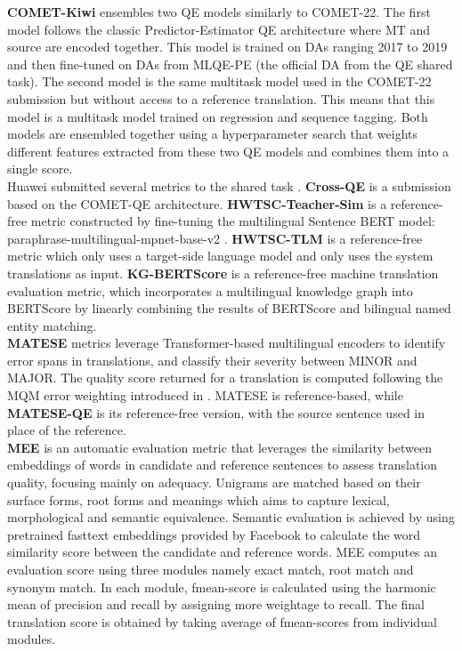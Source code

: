 \documentclass[11pt]{article}
\begin{document}
\noindent \textbf{COMET-Kiwi} \citep{COMET:WMT22} ensembles two QE models similarly to \textsc{COMET-22}. The first model follows the classic Predictor-Estimator QE architecture where MT and source are encoded together. This model is trained on DAs ranging 2017 to 2019 and then fine-tuned on DAs from MLQE-PE (the official DA from the QE shared task). The second model is the same multitask model used in the \textsc{COMET-22} submission but without access to a reference translation. This means that this model is a multitask model trained on regression and sequence tagging. Both models are ensembled together using a hyperparameter search that weights different features extracted from these two QE models and combines them into a single score.\\

\noindent Huawei submitted several metrics to the shared task \citep{HWTSC-Metrics:WMT22}. \textbf{Cross-QE} is a submission based on the \textsc{COMET-QE} architecture.  \textbf{HWTSC-Teacher-Sim} is a reference-free metric constructed by fine-tuning the multilingual Sentence BERT model: paraphrase-multilingual-mpnet-base-v2 \citep{reimers-gurevych-2019-sentence}. \textbf{HWTSC-TLM} is a reference-free metric which only uses a target-side language model and only uses the system translations as input. \textbf{KG-BERTScore} is a reference-free machine translation evaluation metric, which incorporates a multilingual knowledge graph into BERTScore by linearly combining the results of BERTScore and bilingual named entity matching. \\


\noindent \textbf{MATESE} metrics \citep{MATESE:WMT22} leverage Transformer-based multilingual encoders to identify error spans in translations, and classify their severity between MINOR and MAJOR. The quality score returned for a translation is computed following the MQM error weighting introduced in  \citet{freitag-etal-2021-experts}. \textsc{MATESE} is reference-based, while \textbf{MATESE-QE} is its reference-free version, with the source sentence used in place of the reference.\\

\noindent \textbf{MEE} \citep{MEE2020} is an automatic evaluation metric that leverages the similarity between embeddings of words in candidate and reference sentences to assess translation quality, focusing mainly on adequacy. Unigrams are matched based on their surface forms, root forms and meanings which aims to capture lexical, morphological and semantic equivalence. Semantic evaluation is achieved by using pretrained fasttext embeddings provided by Facebook to calculate the word similarity score between the candidate and reference words. MEE computes an evaluation score using three modules namely exact match, root match and synonym match. In each module, fmean-score is calculated using the harmonic mean of precision and recall by assigning more weightage to recall. The final translation score is obtained by taking average of fmean-scores from individual modules.\\
\end{document}
